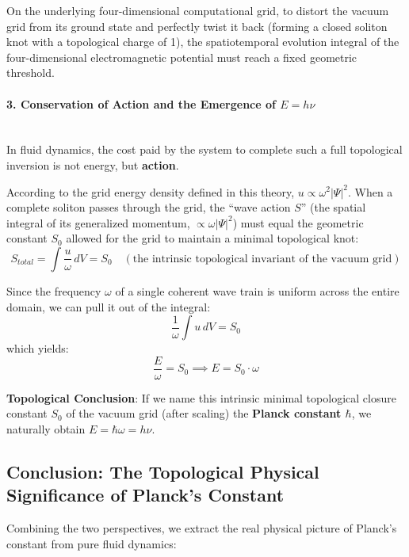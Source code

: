 \documentclass[12pt, a4paper]{article}
\begin{document}
On the underlying four-dimensional computational grid, to distort the vacuum grid from its ground state and perfectly twist it back (forming a closed soliton knot with a topological charge of 1), the spatiotemporal evolution integral of the four-dimensional electromagnetic potential must reach a fixed geometric threshold.

\paragraph{3. Conservation of Action and the Emergence of $E = h\nu$} ~\\
In fluid dynamics, the cost paid by the system to complete such a full topological inversion is not energy, but \textbf{action}.

According to the grid energy density defined in this theory, $u \propto \omega^2 |\Psi|^2$. When a complete soliton passes through the grid, the ``wave action $S$'' (the spatial integral of its generalized momentum, $\propto \omega |\Psi|^2$) must equal the geometric constant $S_0$ allowed for the grid to maintain a minimal topological knot:
\begin{equation}
    S_{total} = \int \frac{u}{\omega} \, dV = S_0 \quad (\text{the intrinsic topological invariant of the vacuum grid}) \label{eq:wave_action}
\end{equation}

Since the frequency $\omega$ of a single coherent wave train is uniform across the entire domain, we can pull it out of the integral:
\begin{equation}
    \frac{1}{\omega} \int u \, dV = S_0
\end{equation}
which yields:
\begin{equation}
    \frac{E}{\omega} = S_0 \implies E = S_0 \cdot \omega
\end{equation}

\textbf{Topological Conclusion}: If we name this intrinsic minimal topological closure constant $S_0$ of the vacuum grid (after scaling) the \textbf{Planck constant $\hbar$}, we naturally obtain $E = \hbar\omega = h\nu$.

\subsection{Conclusion: The Topological Physical Significance of Planck's Constant}

Combining the two perspectives, we extract the real physical picture of Planck's constant from pure fluid dynamics:
\end{document}
